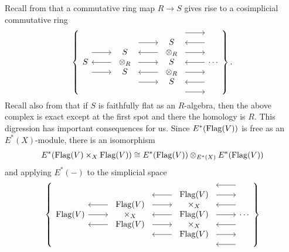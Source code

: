 Recall from  that a commutative ring map \(R \rightarrow S\) gives rise to a cosimplicial commutative ring
\[\left\{
\begin{tikzcd}[ampersand replacement=\&]
S \arrow[leftarrow]{r} \arrow[shift left=\baselineskip]{r} \arrow[shift right=\baselineskip]{r} \&
\begin{array}{c} S \\ \otimes_R \\ S \end{array} \arrow[shift left=(2*\baselineskip)]{r} \arrow[leftarrow, shift left=\baselineskip]{r} \arrow{r} \arrow[leftarrow, shift right=\baselineskip]{r} \arrow[shift right=(2*\baselineskip)]{r} \&
\begin{array}{c} S \\ \otimes_R \\ S \\ \otimes_R \\ S \end{array} \arrow[shift left=(3*\baselineskip)]{r} \arrow[leftarrow, shift left=(2*\baselineskip)]{r} \arrow[shift left=\baselineskip]{r} \arrow[leftarrow]{r} \arrow[shift right=\baselineskip]{r} \arrow[leftarrow, shift right=(2*\baselineskip)]{r} \arrow[shift right=(3*\baselineskip)]{r} \&
\cdots
\end{tikzcd}
\right\}.\]
Recall also from  that if \(S\) is faithfully flat as an \(R\)-algebra, then the above complex is exact except at the first spot and there the homology is \(R\).
This digression has important consequences for us.
Since \(E^*(\operatorname{Flag}(V))\) is free as an \(E^*(X)\)-module, there is an isomorphism
\[
E^*(\operatorname{Flag}(V) \times_X \operatorname{Flag}(V)) \cong E^*(\operatorname{Flag}(V)) \otimes_{E^*(X)} E^*(\operatorname{Flag}(V))
\]
and applying \(E^*(-)\) to the simplicial space
\[\left\{
\begin{tikzcd}[ampersand replacement=\&]
\Flag(V) \arrow{r} \arrow[leftarrow,shift left=\baselineskip]{r} \arrow[leftarrow,shift right=\baselineskip]{r} \&
\begin{array}{c} \Flag(V) \\ \times_X \\ \Flag(V) \end{array} \arrow[leftarrow, shift left=(2*\baselineskip)]{r} \arrow[shift left=\baselineskip]{r} \arrow[leftarrow]{r} \arrow[shift right=\baselineskip]{r} \arrow[leftarrow, shift right=(2*\baselineskip)]{r} \&
\begin{array}{c} \Flag(V) \\ \times_X \\ \Flag(V) \\ \times_X \\ \Flag(V) \end{array} \arrow[leftarrow, shift left=(3*\baselineskip)]{r} \arrow[shift left=(2*\baselineskip)]{r} \arrow[leftarrow, shift left=\baselineskip]{r} \arrow{r} \arrow[leftarrow, shift right=\baselineskip]{r} \arrow[shift right=(2*\baselineskip)]{r} \arrow[leftarrow, shift right=(3*\baselineskip)]{r} \&
\cdots
\end{tikzcd}
\right\}\]
